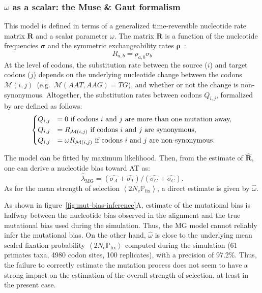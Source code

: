 \documentclass{article}
\newcommand{\UniDimArray}[1]{\bm{#1}}
\newcommand{\BiDimArray}[1]{\bm{#1}}
\newcommand{\Ne}{N_{\text{e}}}
\newcommand{\proba}{\mathbb{P}}
\newcommand{\Pfix}{2 \Ne \proba_{\text{fix}}}
\newcommand{\mutmatrix}{R}
\newcommand{\Mutmatrix}{\BiDimArray{\mutmatrix}}
\newcommand{\exchan}{\rho}
\newcommand{\Exchan}{\UniDimArray{\exchan}}
\newcommand{\mutequi}{\sigma}
\newcommand{\Mutequi}{\UniDimArray{\mutequi}}
\newcommand{\ci}{{i}}
\newcommand{\cj}{{j}}
\newcommand{\itoj}{\ci, \cj}
\newcommand{\nuc}{\mathcal{M}}
\newcommand{\nucitoj}{\nuc(\itoj)}
\newcommand{\submatrix}{Q}
\newcommand{\avgpfix}{\left\langle \Pfix \right\rangle }
\begin{document}
\subsubsection{\texorpdfstring{$\omega$}{ω} as a scalar: the Muse \& Gaut formalism}
This model is defined in terms of a generalized time-reversible nucleotide rate matrix $\Mutmatrix$ and a scalar parameter $\omega$.
The matrix $\Mutmatrix$ is a function of the nucleotide frequencies $\Mutequi$ and the symmetric exchangeability rates $\Exchan$~\citep{Tavare1986}:
\begin{equation}
 \mutmatrix_{a, b} = \exchan_{a,b}\mutequi_b
\end{equation}
At the level of codons, the {substitution} rate between the source ($\ci$) and target codons ($\cj$) depends on the underlying nucleotide change between the codons $\nucitoj$~(e.g.~$\nuc(AAT, AAG) = TG$), and whether or not the change is {non-synonymous}.
Altogether, the {substitution} rates between codons $\submatrix_{\itoj}$, formalized by \citet{Muse1994} are defined as follows:
\begin{equation}
 \begin{dcases}
 \submatrix_{\itoj} & = 0 \text{ if codons $\ci$ and $\cj$ are more than one mutation away,} \\
 \submatrix_{\itoj} & = \mutmatrix_{\nucitoj} \text{ if codons $\ci$ and $\cj$ are {synonymous},} \\
 \submatrix_{\itoj} & = \omega \mutmatrix_{\nucitoj} \text{ if codons $\ci$ and $\cj$ are non-synonymous}.
 \end{dcases}
 \label{eq:codon-muse-gaut}
\end{equation}

The model can be fitted by maximum {likelihood}.
Then, from the estimate of $\widehat{\Mutmatrix}$, one can derive a nucleotide bias toward AT as:
\begin{equation}
 \widehat{\lambda}_{\text{{MG}}} = (\widehat{\mutequi_A} +\widehat{\mutequi_T}) /(\widehat{\mutequi_G} +\widehat{\mutequi_C}).\label{eq:lambda-R}
\end{equation}
As for the mean strength of selection $\avgpfix$, a direct estimate is given by $\widehat{\omega}$.

As shown in figure~\ref{fig:mut-bias-inference}A, estimate of the mutational bias is halfway between the nucleotide bias observed in the alignment and the true mutational bias used during the simulation.
Thus, the {MG} model cannot reliably infer the mutational bias.
On the other hand, $\widehat{\omega}$ is close to the underlying mean scaled fixation probability $\avgpfix$ computed during the simulation (61 primates taxa, 4980 codon sites, 100 replicates), with a precision of 97.2\%.
Thus, the failure to correctly estimate the mutation process does not seem to have a strong impact on the estimation of the overall strength of selection, at least in the present case.
\end{document}
